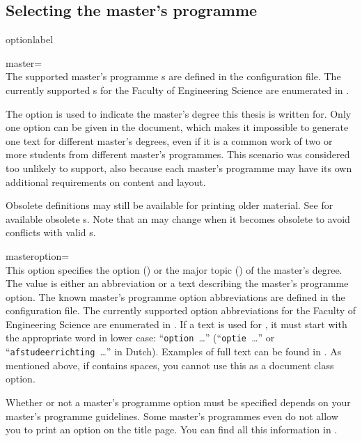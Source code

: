 \subsection{Selecting the master's programme}
\begin{labelled}{optionlabel}
\item[master=\meta{id\,}]\\
  The supported master's programme s are defined in the
  configuration file. The currently supported s for the Faculty of
  Engineering Science are enumerated in .

  The  option is used to indicate the master's degree this thesis
  is written for. Only one  option can be given in the document,
  which makes it impossible to generate one text for different master's
  degrees, even if it is a common work of two or more students from different
  master's programmes. This scenario was considered too unlikely to support,
  also because each master's programme may have its own additional requirements
  on content and layout.

  Obsolete  definitions may still be available for printing older
  material. See  for available obsolete s.
  Note that an  may change when it becomes obsolete to avoid
  conflicts with valid s.

\item[masteroption=\meta{mo}]\\
  This option specifies the option () or the major topic
  () of the master's degree. The value  is
  either an abbreviation or a text describing the master's programme option.
  The known master's programme option abbreviations are defined in the
  configuration file. The currently supported option abbreviations for the
  Faculty of Engineering Science are enumerated in . If a
  text is used for , it must start with the appropriate word in lower
  case: ``\texttt{option }\ldots'' (``\texttt{\foreignlanguage{dutch}{optie}
  }\ldots'' or ``\texttt{\foreignlanguage{dutch}{afstudeerrichting} }\ldots''
  in Dutch). Examples of full text can be found in . As
  mentioned above, if  contains spaces, you cannot use this as a
  document class option.

  Whether or not a master's programme option must be specified depends on your
  master's programme guidelines. Some master's programmes even do not allow you
  to print an option on the title page. You can find all this information in
  .


\end{labelled}
